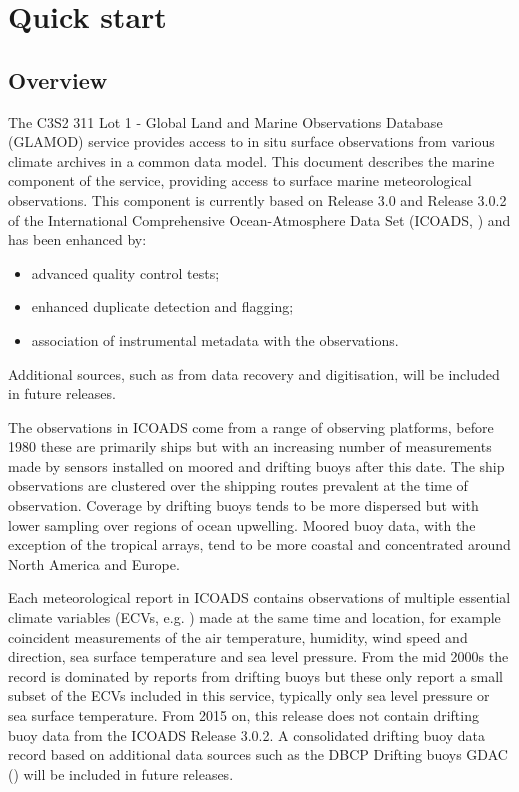 \section{Quick start}
\subsection{Overview}

The C3S2 311 Lot 1 - Global Land and Marine Observations Database (GLAMOD) service provides access to in situ surface observations from various climate archives in a common data model.
This document describes the marine component of the service, providing access to surface marine meteorological observations.
This component is currently based on Release 3.0 and Release 3.0.2 of the International Comprehensive Ocean-Atmosphere Data Set (ICOADS, \cite{Freeman2017,Liu2022}) and has been enhanced by: 
\begin{itemize}
\item advanced quality control tests; 
\item enhanced duplicate detection and flagging; 
\item association of instrumental metadata with the observations. 
\end{itemize}
Additional sources, such as from data recovery and digitisation, will be included in future releases.

The observations in ICOADS come from a range of observing platforms, before 1980 these are primarily ships but with an increasing number of measurements made by sensors installed on moored and drifting buoys after this date. 
The ship observations are clustered over the shipping routes prevalent at the time of observation. 
Coverage by drifting buoys tends to be more dispersed but with lower sampling over regions of ocean upwelling. 
Moored buoy data, with the exception of the tropical arrays, tend to be more coastal and concentrated around North America and Europe.

Each meteorological report in ICOADS contains observations of multiple essential climate variables (ECVs, e.g. \cite{Bojinski2014}) made at the same time and location, for example coincident measurements of the air temperature, humidity, wind speed and direction, sea surface temperature and sea level pressure.
From the mid 2000s the record is dominated by reports from drifting buoys but these only report a small subset of the ECVs included in this service, typically only sea level pressure or sea surface temperature.
From 2015 on, this release does not contain drifting buoy data from the ICOADS Release 3.0.2.
A consolidated drifting buoy data record based on additional data sources such as the DBCP Drifting buoys GDAC (\cite{DBCP2022,Coriolis2021}) will be included in future releases.

